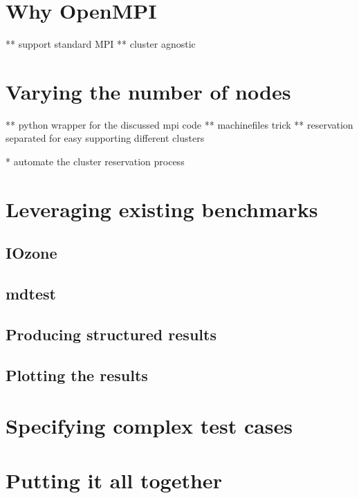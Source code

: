 


\section{Why OpenMPI}

** support standard MPI
** cluster agnostic


\section{Varying the number of nodes}

** python wrapper for the discussed mpi code
** machinefiles trick
** reservation separated for easy supporting different clusters

* automate the cluster reservation process


\section{Leveraging existing benchmarks}

\subsection{IOzone}


\subsection{mdtest}





\subsection{Producing structured results}



\subsection{Plotting the results}





\section{Specifying complex test cases}




\section{Putting it all together}

